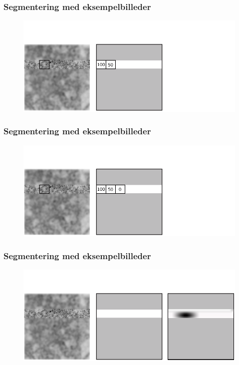 \documentclass[12pt,t]{beamer}
\begin{document}
\begin{frame}
\frametitle{Segmentering med eksempelbilleder}
\begin{figure}[H]
\includegraphics[scale=0.35]{img/afstand/13.png}
\end{figure}
\end{frame}

\begin{frame}
\frametitle{Segmentering med eksempelbilleder}
\begin{figure}[H]
\includegraphics[scale=0.35]{img/afstand/14.png}
\end{figure}
\end{frame}


\begin{frame}
\frametitle{Segmentering med eksempelbilleder}
\begin{figure}[H]
\includegraphics[scale=0.35]{img/afstand/15.png}
\end{figure}
\end{frame}
\end{document}
